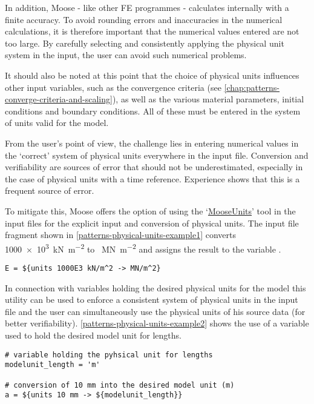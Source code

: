In addition, Moose - like other FE programmes - calculates internally with a
finite accuracy. To avoid rounding errors and inaccuracies in the numerical
calculations, it is therefore important that the numerical values entered are
not too large. By carefully selecting and consistently applying the physical
unit system in the input, the user can avoid such numerical problems.

It should also be noted at this point that the choice of physical units
influences other input variables, such as the convergence criteria (see
\autoref{chap:patterns-converge-criteria-and-scaling}), as well as the various
material parameters, initial conditions and boundary conditions. All of these
must be entered in the system of units valid for the model.

From the user's point of view, the challenge lies in entering numerical values
in the ‘correct’ system of physical units everywhere in the input file.
Conversion and verifiability are sources of error that should not be
underestimated, especially in the case of physical units with a time reference.
Experience shows that this is a frequent source of error.

To mitigate this, Moose offers the option of using the
‘\href{https://mooseframework.inl.gov/source/utils/Units.html}{MooseUnits}’
tool in the input files for the explicit input and conversion of physical
units. The input file fragment shown in
\autoref{patterns-physical-units-example1} converts \SI{1000e3}{\kN\per\m^2} to
\SI{}{\MN\per\m^2} and assigns the result to the variable .

\begin{lstlisting}[language=Moose, caption={Converting \SI{1000e3}{\kN\per\m^2} into
    \SI{}{\MN\per\m^2}},label={patterns-physical-units-example1}]
E = ${units 1000E3 kN/m^2 -> MN/m^2}
\end{lstlisting}

In connection with variables holding the desired physical units for the model
this utility can be used to enforce a consistent system of physical units in
the input file and the user can simultaneously use the physical units of his
source data (for better verifiability).
\autoref{patterns-physical-units-example2} shows the use of a variable used to
hold the desired model unit for lengths.

\begin{lstlisting}[language=Moose, caption={Using a variable to hold the physical unit for lengths},label={patterns-physical-units-example2}]
# variable holding the pyhsical unit for lengths
modelunit_length = 'm'

# conversion of 10 mm into the desired model unit (m)
a = ${units 10 mm -> ${modelunit_length}}
\end{lstlisting}

